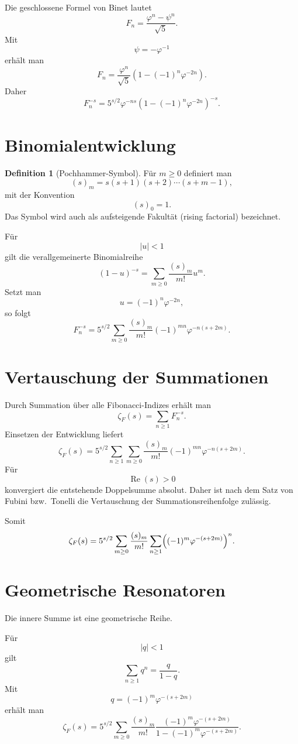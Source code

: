 \documentclass[11pt]{article}
\theoremstyle{definition}
\newtheorem{definition}{Definition}
\begin{document}
	Die geschlossene Formel von Binet lautet
	\[
	F_n
	=
	\frac{\varphi^n-\psi^n}{\sqrt5}.
	\]
	Mit
	\[
	\psi=-\varphi^{-1}
	\]
	erh\"alt man
	\[
	F_n
	=
	\frac{\varphi^n}{\sqrt5}
	\left(
	1-(-1)^n\varphi^{-2n}
	\right).
	\]
	Daher
	\[
	F_n^{-s}
	=
	5^{s/2}
	\varphi^{-ns}
	\left(
	1-(-1)^n\varphi^{-2n}
	\right)^{-s}.
	\]
	
	\section{Binomialentwicklung}
	
	\begin{definition}[Pochhammer-Symbol]
		F\"ur $m\ge0$ definiert man
		\[
		(s)_m
		=
		s(s+1)(s+2)\cdots(s+m-1),
		\]
		mit der Konvention
		\[
		(s)_0=1.
		\]
		Das Symbol wird auch als aufsteigende Fakult\"at
		(rising factorial) bezeichnet.
	\end{definition}
	
	F\"ur
	\[
	|u|<1
	\]
	gilt die verallgemeinerte Binomialreihe
	\[
	(1-u)^{-s}
	=
	\sum_{m\ge0}
	\frac{(s)_m}{m!}u^m.
	\]
	Setzt man
	\[
	u=(-1)^n\varphi^{-2n},
	\]
	so folgt
	\[
	F_n^{-s}
	=
	5^{s/2}
	\sum_{m\ge0}
	\frac{(s)_m}{m!}
	(-1)^{mn}
	\varphi^{-n(s+2m)}.
	\]
	
	\section{Vertauschung der Summationen}
	
	Durch Summation \"uber alle Fibonacci-Indizes erh\"alt man
	\[
	\zeta_F(s)
	=
	\sum_{n\ge1}F_n^{-s}.
	\]
	Einsetzen der Entwicklung liefert
	\[
	\zeta_F(s)
	=
	5^{s/2}
	\sum_{n\ge1}
	\sum_{m\ge0}
	\frac{(s)_m}{m!}
	(-1)^{mn}
	\varphi^{-n(s+2m)}.
	\]
	F\"ur
	\[
	\operatorname{Re}(s)>0
	\]
	konvergiert die entstehende Doppelsumme absolut.
	Daher ist nach dem Satz von Fubini bzw.\ Tonelli
	die Vertauschung der Summationsreihenfolge zul\"assig.
	
	Somit
	\[
	\zeta_F(s)
	=
	5^{s/2}
	\sum_{m\ge0}
	\frac{(s)_m}{m!}
	\sum_{n\ge1}
	\Bigl(
	(-1)^m
	\varphi^{-(s+2m)}
	\Bigr)^n.
	\]
	
	\section{Geometrische Resonatoren}
	
	Die innere Summe ist eine geometrische Reihe.
	
	F\"ur
	\[
	|q|<1
	\]
	gilt
	\[
	\sum_{n\ge1}q^n
	=
	\frac{q}{1-q}.
	\]
	Mit
	\[
	q
	=
	(-1)^m
	\varphi^{-(s+2m)}
	\]
	erh\"alt man
	\[
	\boxed{
		\zeta_F(s)
		=
		5^{s/2}
		\sum_{m\ge0}
		\frac{(s)_m}{m!}
		\frac{
			(-1)^m\varphi^{-(s+2m)}
		}{
			1-(-1)^m\varphi^{-(s+2m)}
		}.
	}
	\]
	
\end{document}
